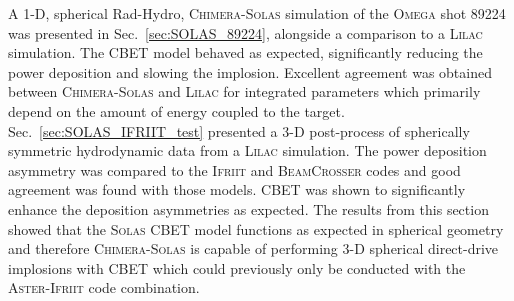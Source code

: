 A 1-D, spherical \ac{Rad-Hydro}, \textsc{Chimera}-\textsc{Solas} simulation of the \textsc{Omega} shot 89224 was presented in Sec.~\ref{sec:SOLAS_89224}, alongside a comparison to a \textsc{Lilac} simulation.
The \ac{CBET} model behaved as expected, significantly reducing the power deposition and slowing the implosion.
Excellent agreement was obtained between \textsc{Chimera}-\textsc{Solas} and \textsc{Lilac} for integrated parameters which primarily depend on the amount of energy coupled to the target.
Sec.~\ref{sec:SOLAS_IFRIIT_test} presented a 3-D post-process of spherically symmetric hydrodynamic data from a \textsc{Lilac} simulation.
The power deposition asymmetry was compared to the \textsc{Ifriit} and \textsc{BeamCrosser} codes and good agreement was found with those models.
\ac{CBET} was shown to significantly enhance the deposition asymmetries as expected.
The results from this section showed that the \textsc{Solas} \ac{CBET} model functions as expected in spherical geometry and therefore \textsc{Chimera}-\textsc{Solas} is capable of performing 3-D spherical direct-drive implosions with \ac{CBET} which could previously only be conducted with the \textsc{Aster}-\textsc{Ifriit} code combination.
